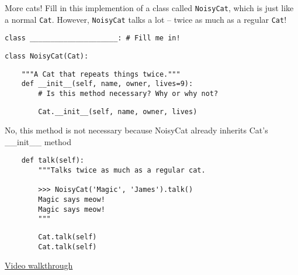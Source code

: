 \question More cats! Fill in this implemention of a class called
\texttt{NoisyCat}, which is just like a normal \texttt{Cat}. However,
\texttt{NoisyCat} talks a lot -- twice as much as a regular \texttt{Cat}!

\begin{lstlisting}
class _____________________: # Fill me in!
\end{lstlisting}
\begin{solution}
\begin{lstlisting}
class NoisyCat(Cat):
\end{lstlisting}
\end{solution}
\begin{lstlisting}
    """A Cat that repeats things twice."""
    def __init__(self, name, owner, lives=9):
        # Is this method necessary? Why or why not?
        \end{lstlisting}

        \begin{solution}[.2in]
        \begin{lstlisting}
        Cat.__init__(self, name, owner, lives)
        \end{lstlisting}
        No, this method is not necessary because NoisyCat already inherits Cat's \_\_init\_\_ method
        \end{solution}

        \begin{lstlisting}
    def talk(self):
        """Talks twice as much as a regular cat.

        >>> NoisyCat('Magic', 'James').talk()
        Magic says meow!
        Magic says meow!
        """
        \end{lstlisting}

        \begin{solution}[.3in]
        \begin{lstlisting}
        Cat.talk(self)
        Cat.talk(self)
        \end{lstlisting}
        \end{solution}
\begin{solution}
\href{https://www.youtube.com/watch?v=BatqjYa7WZ8&list=PLx38hZJ5RLZfel-Gi9pjaUbfQDCZIsWMU&vq=hd1080&t=38m10s}{Video walkthrough}
\end{solution}
